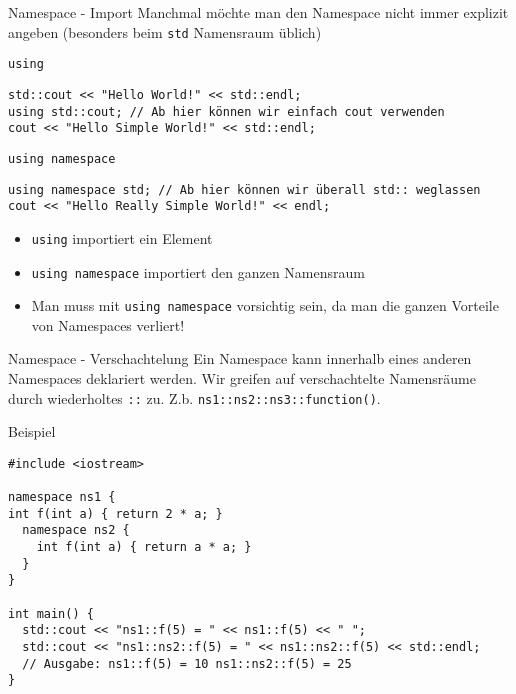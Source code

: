 \documentclass[presentation]{beamer}
\begin{document}
\begin{frame}[label={sec:orgc9ed359},fragile]{Namespace - Import}
 Manchmal möchte man den Namespace nicht immer explizit angeben
(besonders beim {\color{solarizedYellow}\verb!std!} Namensraum üblich)
\begin{block}{{\color{solarizedYellow}\texttt{using}}}
\begin{verbatim}
std::cout << "Hello World!" << std::endl;
using std::cout; // Ab hier können wir einfach cout verwenden
cout << "Hello Simple World!" << std::endl;
\end{verbatim}
\end{block}
\begin{block}{{\color{solarizedYellow}\texttt{using namespace}}}
\begin{verbatim}
using namespace std; // Ab hier können wir überall std:: weglassen
cout << "Hello Really Simple World!" << endl;
\end{verbatim}
\end{block}
\begin{itemize}
\item {\color{solarizedYellow}\texttt{using}} importiert ein Element
\item {\color{solarizedYellow}\texttt{using namespace}} importiert den ganzen Namensraum
\item Man muss mit {\color{solarizedYellow}\verb!using namespace!} vorsichtig sein, da man die ganzen
Vorteile von Namespaces verliert!
\end{itemize}
\end{frame}
\begin{frame}[label={sec:orgf9022b4},fragile]{Namespace - Verschachtelung}
 Ein Namespace kann innerhalb eines anderen Namespaces deklariert
werden. Wir greifen auf verschachtelte Namensräume durch wiederholtes
{\color{solarizedYellow}\verb!::!} zu. Z.b. {\color{solarizedYellow}\verb!ns1::ns2::ns3::function()!}.
\begin{block}{Beispiel}
\begin{verbatim}
#include <iostream>

namespace ns1 {
int f(int a) { return 2 * a; }
  namespace ns2 {
    int f(int a) { return a * a; }
  }
}

int main() {
  std::cout << "ns1::f(5) = " << ns1::f(5) << " ";
  std::cout << "ns1::ns2::f(5) = " << ns1::ns2::f(5) << std::endl;
  // Ausgabe: ns1::f(5) = 10 ns1::ns2::f(5) = 25
}
\end{verbatim}
\end{block}
\end{frame}
\end{document}

